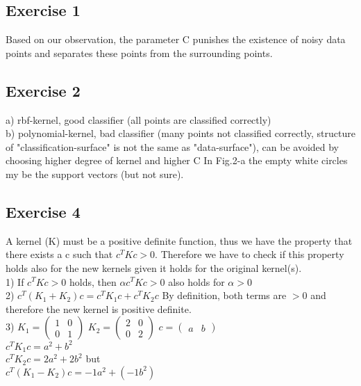 \documentclass{article}
\begin{document}
\subsection*{Exercise 1}
Based on our observation, the parameter C punishes the existence of noisy data points and separates these points from the surrounding points.  


\subsection*{Exercise 2}
a) rbf-kernel, good classifier (all points are classified correctly) \\
b) polynomial-kernel, bad classifier (many points not classified correctly, structure of "classification-surface" is not the same as "data-surface"), can be avoided by choosing higher degree of kernel and higher C
In Fig.2-a the empty white circles my be the support vectors (but not sure).

\subsection*{Exercise 4}
A kernel (K) must be a positive definite function, thus we have the property that there exists a c such that $ c^{T}Kc >0 $. Therefore we have to check if this property holds also for the new kernels given it holds for the original kernel(s).\\
1) If $ c^{T}Kc >0 $ holds, then $ \alpha c^{T}Kc >0 $ also holds for $ \alpha > 0 $\\
2) $ c^{T}(K_{1}+K_{2})c  =  c^{T}K_{1}c + c^{T}K_{2}c $ By definition, both terms are $ >0 $ and therefore the new kernel is positive definite.\\
3) $ K_{1}=\begin{pmatrix} 1 & 0\\0 & 1\end{pmatrix} $ $ K_{2}=\begin{pmatrix} 2 & 0\\0 & 2\end{pmatrix} $ $ c=\begin{pmatrix} a & b\end{pmatrix} $ \\
$ c^{T}K_{1}c=a^{2}+b^{2} $\\
$ c^{T}K_{2}c=2a^{2}+2b^{2} $ but\\
$ c^{T}(K_{1}-K_{2})c=-1a^{2}+(-1b^{2}) $
\newpage
\end{document}
